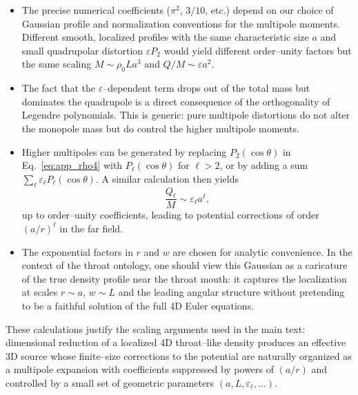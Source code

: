 \documentclass[12pt]{article}
\begin{document}
\begin{itemize}
  \item The precise numerical coefficients ($\pi^2$, $3/10$, etc.) depend on
        our choice of Gaussian profile and normalization conventions for the
        multipole moments.  Different smooth, localized profiles with the
        same characteristic size $a$ and small quadrupolar distortion
        $\varepsilon P_2$ would yield different order--unity factors but the
        same scaling $M\sim \rho_0 L a^3$ and $Q/M\sim \varepsilon a^2$.

  \item The fact that the $\varepsilon$--dependent term drops out of the
        total mass but dominates the quadrupole is a direct consequence of
        the orthogonality of Legendre polynomials.  This is generic: pure
        multipole distortions do not alter the monopole mass but do control
        the higher multipole moments.

  \item Higher multipoles can be generated by replacing $P_2(\cos\theta)$ in
        Eq.~\eqref{eq:app_rho4} with $P_\ell(\cos\theta)$ for $\ell>2$, or
        by adding a sum $\sum_\ell \varepsilon_\ell P_\ell(\cos\theta)$.  A
        similar calculation then yields
        \begin{equation}
          \frac{Q_\ell}{M}
          \sim \varepsilon_\ell a^\ell,
        \end{equation}
        up to order--unity coefficients, leading to potential corrections
        of order $(a/r)^\ell$ in the far field.

  \item The exponential factors in $r$ and $w$ are chosen for analytic
        convenience.  In the context of the throat ontology, one should view
        this Gaussian as a caricature of the true density profile near the
        throat mouth: it captures the localization at scales $r\sim a$,
        $w\sim L$ and the leading angular structure without pretending to be
        a faithful solution of the full 4D Euler equations.
\end{itemize}

These calculations justify the scaling arguments used in the main text:
dimensional reduction of a localized 4D throat--like density produces an
effective 3D source whose finite--size corrections to the potential are
naturally organized as a multipole expansion with coefficients suppressed by
powers of $(a/r)$ and controlled by a small set of geometric parameters
$(a,L,\varepsilon_\ell,\ldots)$.
\end{document}
